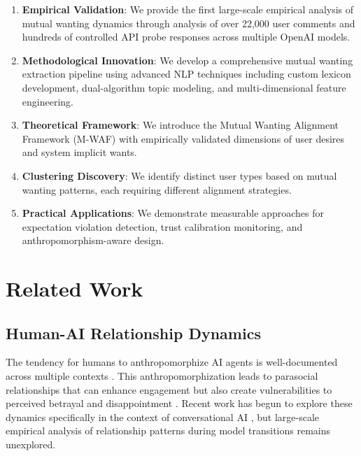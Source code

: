 \documentclass{article}
\begin{document}
\begin{enumerate}
    \item \textbf{Empirical Validation}: We provide the first large-scale empirical analysis of mutual wanting dynamics through analysis of over 22,000 user comments and hundreds of controlled API probe responses across multiple OpenAI models.
    
    \item \textbf{Methodological Innovation}: We develop a comprehensive mutual wanting extraction pipeline using advanced NLP techniques including custom lexicon development, dual-algorithm topic modeling, and multi-dimensional feature engineering.
    
    \item \textbf{Theoretical Framework}: We introduce the Mutual Wanting Alignment Framework (M-WAF) with empirically validated dimensions of user desires and system implicit wants.
    
    \item \textbf{Clustering Discovery}: We identify distinct user types based on mutual wanting patterns, each requiring different alignment strategies.
    
    \item \textbf{Practical Applications}: We demonstrate measurable approaches for expectation violation detection, trust calibration monitoring, and anthropomorphism-aware design.
\end{enumerate}

\section{Related Work}

\subsection{Human-AI Relationship Dynamics}

The tendency for humans to anthropomorphize AI agents is well-documented across multiple contexts \citep{epley2007seeing, waytz2010see}. This anthropomorphization leads to parasocial relationships that can enhance engagement but also create vulnerabilities to perceived betrayal and disappointment \citep{horton1956mass}. Recent work has begun to explore these dynamics specifically in the context of conversational AI \citep{maeda2024parasocial, omeish2025between}, but large-scale empirical analysis of relationship patterns during model transitions remains unexplored.
\end{document}
